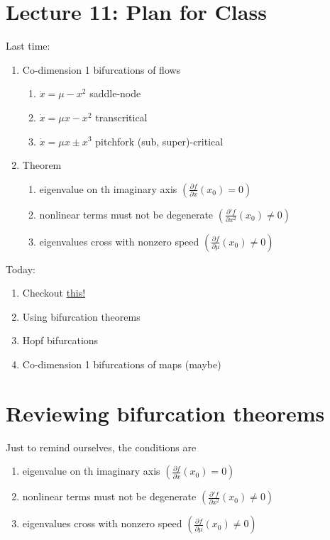 \documentclass{article}
\begin{document}
\section{Lecture 11: Plan for Class}
Last time:
\begin{enumerate}
    \item Co-dimension 1 bifurcations of flows
    \begin{enumerate}
        \item $\dot{x}=\mu-x^2$ saddle-node
        \item $\dot{x}=\mu x-x^2$ transcritical
        \item $\dot{x}=\mu x\pm x^3$ pitchfork (sub, super)-critical
    \end{enumerate}
    \item Theorem
    \begin{enumerate}
        \item eigenvalue on th imaginary axis $\left(\frac{\partial f}{\partial x}(x_0)=0\right)$
        \item nonlinear terms must not be degenerate $\left( \frac{\partial' f}{\partial x^2}(x_0)\neq 0 \right)$
        \item eigenvalues cross with nonzero speed $\left(\frac{\partial f}{\partial \mu}(x_0)\neq 0\right)$
    \end{enumerate}
\end{enumerate}

Today:
\begin{enumerate}
    \item Checkout \href{https://vanderbei.princeton.edu/nBody_animations/index.html}{this!}
    \item Using bifurcation theorems
    \item Hopf bifurcations
    \item Co-dimension 1 bifurcations of maps (maybe)
\end{enumerate}

\section{Reviewing bifurcation theorems}

Just to remind ourselves, the conditions are 
\begin{enumerate}
    \item eigenvalue on th imaginary axis $\left(\frac{\partial f}{\partial x}(x_0)=0\right)$
    \item nonlinear terms must not be degenerate $\left( \frac{\partial' f}{\partial x^2}(x_0)\neq 0 \right)$
    \item eigenvalues cross with nonzero speed $\left(\frac{\partial f}{\partial \mu}(x_0)\neq 0\right)$
\end{enumerate}
\end{document}
